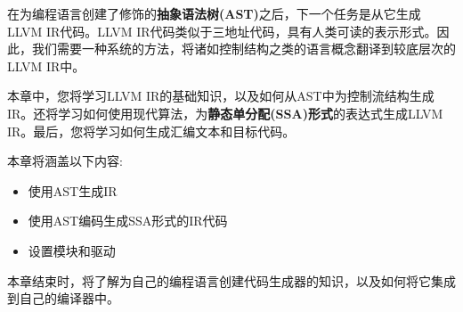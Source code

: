 在为编程语言创建了修饰的\textbf{抽象语法树(AST)}之后，下一个任务是从它生成LLVM IR代码。LLVM IR代码类似于三地址代码，具有人类可读的表示形式。因此，我们需要一种系统的方法，将诸如控制结构之类的语言概念翻译到较底层次的LLVM IR中。\par

本章中，您将学习LLVM IR的基础知识，以及如何从AST中为控制流结构生成IR。还将学习如何使用现代算法，为\textbf{静态单分配(SSA)形式}的表达式生成LLVM IR。最后，您将学习如何生成汇编文本和目标代码。\par

本章将涵盖以下内容:\par

\begin{itemize}
\item 使用AST生成IR
\item 使用AST编码生成SSA形式的IR代码
\item 设置模块和驱动
\end{itemize}

本章结束时，将了解为自己的编程语言创建代码生成器的知识，以及如何将它集成到自己的编译器中。\par















































